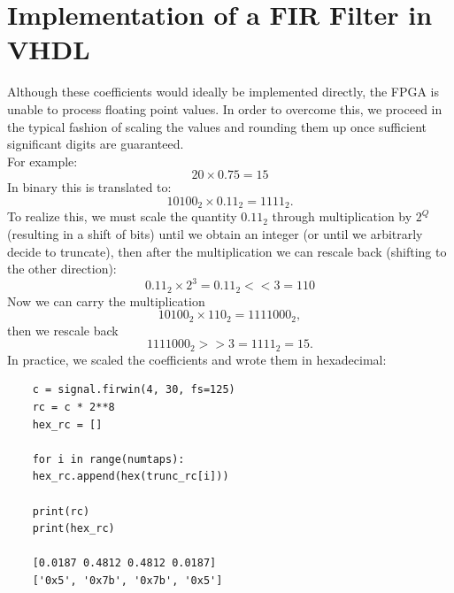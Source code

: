 \documentclass[11pt,a4paper,twocolumn]{IEEEtran}
\begin{document}
	\section{Implementation of a FIR Filter in VHDL}
	Although these coefficients would ideally be implemented directly, the FPGA is unable to process floating point values. In order to overcome this, we proceed in the typical fashion of scaling the values and rounding them up once sufficient significant digits are guaranteed.\\
	For example:\\$$20\times 0.75 = 15$$ In binary this is translated to:
	$$ 10100_2 \times 0.11_2 = 1111_2.$$
	To realize this, we must scale the quantity $0.11_2$ through multiplication by $2^Q$ (resulting in a shift of bits) until we obtain an integer (or until we arbitrarly decide to truncate), then after the multiplication we can rescale back (shifting to the other direction):
	$$0.11_2 \times 2^3 = 0.11_2 <<3 = 110$$
	Now we can carry the multiplication
	$$10100_2\times 110_2 = 1111000_2,$$
	then we rescale back
	$$1111000_2 >> 3 = 1111_2 = 15.$$
	In practice, we scaled the coefficients and wrote them in hexadecimal:
	\begin{lstlisting}
	c = signal.firwin(4, 30, fs=125)
	rc = c * 2**8
	hex_rc = []
	
	for i in range(numtaps):
	hex_rc.append(hex(trunc_rc[i]))
	
	print(rc)    
	print(hex_rc)
	
	[0.0187 0.4812 0.4812 0.0187]
	['0x5', '0x7b', '0x7b', '0x5']
	\end{lstlisting}
\end{document}

